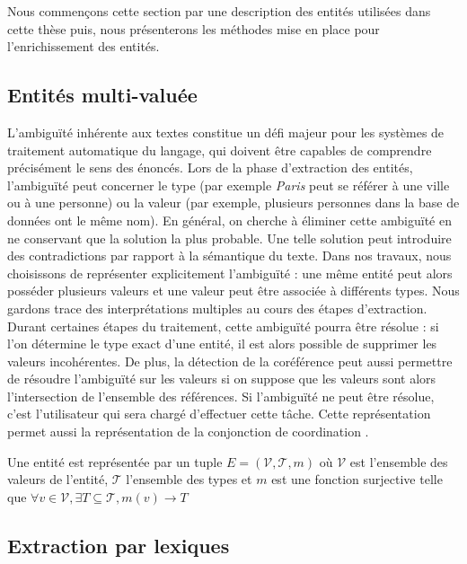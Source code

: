 Nous commençons cette section par une description des entités utilisées dans cette thèse puis, nous présenterons les méthodes mise en place pour l'enrichissement des entités.

\subsection{Entités multi-valuée}

L'ambiguïté inhérente aux textes constitue un défi majeur pour les systèmes de traitement automatique du langage, qui doivent être capables de comprendre précisément le sens des énoncés.
Lors de la phase d'extraction des entités, l'ambiguïté peut concerner le type (par exemple \textit{Paris} peut se référer à une ville ou à une personne) ou la valeur (par exemple, plusieurs personnes dans la base de données ont le même nom).
En général, on cherche à éliminer cette ambiguïté en ne conservant que la solution la plus probable.
Une telle solution peut introduire des contradictions par rapport à la sémantique du texte.
Dans nos travaux, nous choisissons de représenter explicitement l'ambiguïté : une même entité peut alors posséder plusieurs valeurs et une valeur peut être associée à différents types.
Nous gardons trace des interprétations multiples au cours des étapes d'extraction.
Durant certaines étapes du traitement, cette ambiguïté pourra être résolue : si l'on détermine le type exact d'une entité, il est alors possible de supprimer les valeurs incohérentes.
De plus, la détection de la coréférence peut aussi permettre de résoudre l'ambiguïté sur les valeurs si on suppose que les valeurs sont alors l'intersection de l'ensemble des références.
Si l'ambiguïté ne peut être résolue, c'est l'utilisateur qui sera chargé d'effectuer cette tâche.
Cette représentation permet aussi la représentation de la conjonction de coordination .

\begin{definition}
    Une entité est représentée par un tuple $E = (\mathcal{V}, \mathcal{T},  m)$ où $\mathcal{V}$ est l'ensemble des valeurs de l'entité, $\mathcal{T}$ l'ensemble des types et $m$ est une fonction surjective telle que $\forall v \in \mathcal{V}, \exists T \subseteq \mathcal{T}, m(v) \rightarrow T$
\end{definition}

\subsection{Extraction par lexiques}
\label{sec:ie:lexicon}

